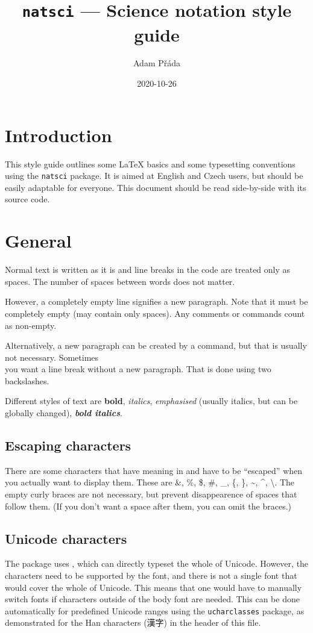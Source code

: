 \documentclass{article}
\title{\vspace{-2cm}\texttt{natsci} --- Science notation style guide}
\author{Adam Přáda}
\date{2020-10-26}
\begin{document}
\pagestyle{fancy}
\maketitle
\section{Introduction}
This style guide outlines some \LaTeX{} basics and some typesetting conventions using the \texttt{natsci} package. It is aimed at English and Czech users, but should be easily adaptable for everyone. This document should be read side-by-side with its source code.
\section{General}
Normal text is written as it is
and line breaks
in
the
code
are treated only as spaces. The number of spaces                            between words does not matter.

However, a completely empty line signifies a new paragraph. Note that it must be completely empty (may contain only spaces). Any comments or commands count as non-empty. \par Alternatively, a new paragraph can be created by a command, but that is usually not necessary. Sometimes\\ you want a line break without a new paragraph. That is done using two backslashes.

Different styles of text are \textbf{bold}, \textit{italics}, \emph{emphasised} (usually italics, but can be globally changed), \textbf{\textit{bold italics}}.

\subsection{Escaping characters}
There are some characters that have meaning in  and have to be ``escaped'' when you actually want to display them. These are \&, \%, \$, \#, \_, \{, \}, \textasciitilde{}, \textasciicircum{}, \textbackslash{}. The empty curly braces are not necessary, but prevent disappearence of spaces that follow them. (If you don't want a space after them, you can omit the braces.)

\subsection{Unicode characters}
The package uses , which can directly typeset the whole of Unicode. However, the characters need to be supported by the font, and there is not a single font that would cover the whole of Unicode. This means that one would have to manually switch fonts if characters outside of the body font are needed. This can be done automatically for predefined Unicode ranges using the \texttt{ucharclasses} package, as demonstrated for the Han characters (漢字) in the header of this file.
\newpage
\end{document}
